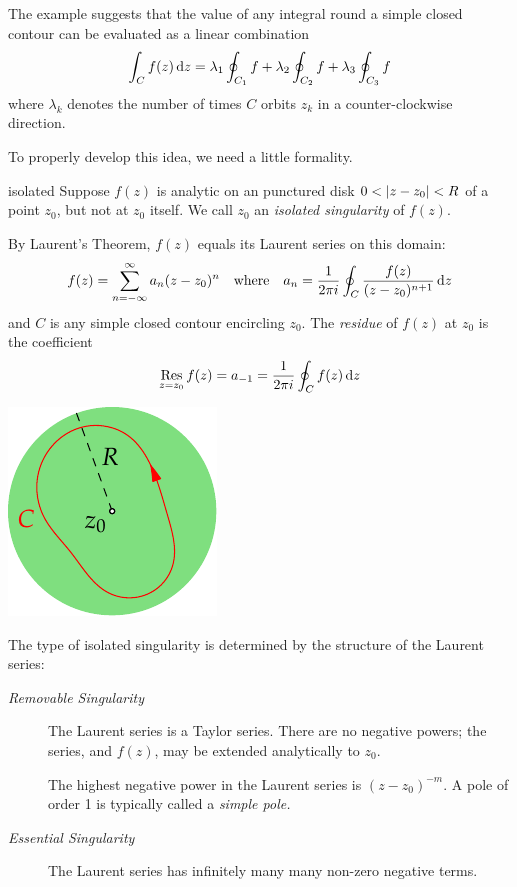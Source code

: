 The example suggests that the value of any integral round a simple closed contour can be evaluated as a linear combination
\[\int_C f(z)\,{\mathrm{d} z}=\lambda_1\oint_{C_1}f+\lambda_2\oint_{C_2}f+\lambda_3\oint_{C_3}f\]
where $\lambda_k$ denotes the number of times $C$ orbits $z_k$ in a counter-clockwise direction.\smallbreak 

To properly develop this idea, we need a little formality.\goodbreak


\begin{defn}{}{isolated}
Suppose $f(z)$ is analytic on an punctured disk $0<\left| z-z_0\right|<R$ of a point $z_0$, but not at $z_0$ itself. We call $z_0$ an \emph{isolated singularity} of $f(z)$.\par
\begin{minipage}[t]{0.75\linewidth}\vspace{-2pt}
By Laurent's Theorem, $f(z)$ equals its Laurent series on this domain:
\[f(z)=\sum_{n=-\infty}^\infty a_n(z-z_0)^n\quad \text{where}\quad a_n=\frac 1{2\pi i}\oint_C\frac{f(z)}{(z-z_0)^{n+1}}\,{\mathrm{d} z}\]
and $C$ is any simple closed contour encircling $z_0$. The \emph{residue} of $f(z)$ at $z_0$ is the coefficient
\[\operatorname*{Res}_{z=z_0}f(z)=a_{-1}=\frac 1{2\pi i}\oint_C f(z)\,{\mathrm{d} z}\]
\end{minipage}\begin{minipage}[t]{0.25\linewidth}\vspace{-15pt}
\flushright\includegraphics{isolatedsing}
\end{minipage}\medbreak
The type of isolated singularity is determined by the structure of the Laurent series:
\begin{description}
	\item[\normalfont\emph{Removable Singularity}] The Laurent series is a Taylor series. There are no negative powers; the series, and $f(z)$, may be extended analytically to $z_0$. 
	\item[] The highest negative power in the Laurent series is $(z-z_0)^{-m}$. A pole of order 1 is typically called a \emph{simple pole.}
	\item[\normalfont\emph{Essential Singularity}] The Laurent series has infinitely many many non-zero negative terms.
\end{description}
\end{defn}


